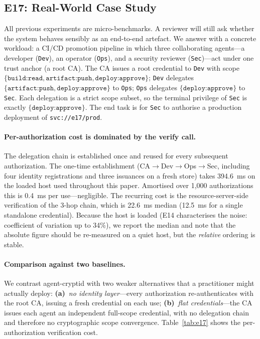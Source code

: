 \documentclass[10pt,twocolumn]{IEEEtran}
\begin{document}
\subsection{E17: Real-World Case Study}

All previous experiments are micro-benchmarks. A reviewer will still
ask whether the system behaves sensibly as an end-to-end artefact.
We answer with a concrete workload: a CI/CD promotion pipeline in
which three collaborating agents---a developer (\texttt{Dev}), an
operator (\texttt{Ops}), and a security reviewer (\texttt{Sec})---act
under one trust anchor (a root CA). The CA issues a root credential to
\texttt{Dev} with scope
$\{\texttt{build:read},\texttt{artifact:push},\texttt{deploy:approve}\}$;
\texttt{Dev} delegates $\{\texttt{artifact:push},\texttt{deploy:approve}\}$
to \texttt{Ops}; \texttt{Ops} delegates $\{\texttt{deploy:approve}\}$
to \texttt{Sec}. Each delegation is a strict scope subset, so the
terminal privilege of \texttt{Sec} is exactly
$\{\texttt{deploy:approve}\}$. The end task is for \texttt{Sec} to
authorise a production deployment of \texttt{svc://e17/prod}.

\paragraph{Per-authorization cost is dominated by the verify call.}
The delegation chain is established once and reused for every
subsequent authorization. The one-time establishment
(CA$\to$Dev$\to$Ops$\to$Sec, including four identity
registrations and three issuances on a fresh store) takes 394.6~ms
on the loaded host used throughout this paper. Amortised over 1,000
authorizations this is 0.4~ms per use---negligible. The recurring
cost is the resource-server-side verification of the 3-hop chain,
which is 22.6~ms median (12.5~ms for a single standalone credential).
Because the host is loaded (E14 characterises the noise:
coefficient of variation up to 34\%), we report the median and note
that the absolute figure should be re-measured on a quiet host, but
the \emph{relative} ordering is stable.

\paragraph{Comparison against two baselines.}
We contrast agent-cryptid with two weaker alternatives that a
practitioner might actually deploy:
\textbf{(a)}~\emph{no identity layer}---every authorization re-authenticates
with the root CA, issuing a fresh credential on each use;
\textbf{(b)}~\emph{flat credentials}---the CA issues each agent an
independent full-scope credential, with no delegation chain and
therefore no cryptographic scope convergence. Table~\ref{tab:e17}
shows the per-authorization verification cost.
\end{document}

